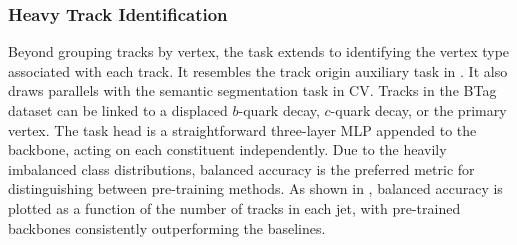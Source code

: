 \subsubsection{Heavy Track Identification}

Beyond grouping tracks by vertex, the task extends to identifying the vertex type associated with each track.
It resembles the track origin auxiliary task in .
It also draws parallels with the semantic segmentation task in CV.
Tracks in the BTag dataset can be linked to a displaced $b$-quark decay, $c$-quark decay, or the primary vertex.
The task head is a straightforward three-layer MLP appended to the backbone, acting on each constituent independently.
Due to the heavily imbalanced class distributions, balanced accuracy is the preferred metric for distinguishing between pre-training methods.
As shown in , balanced accuracy is plotted as a function of the number of tracks in each jet, with pre-trained backbones consistently outperforming the baselines.

